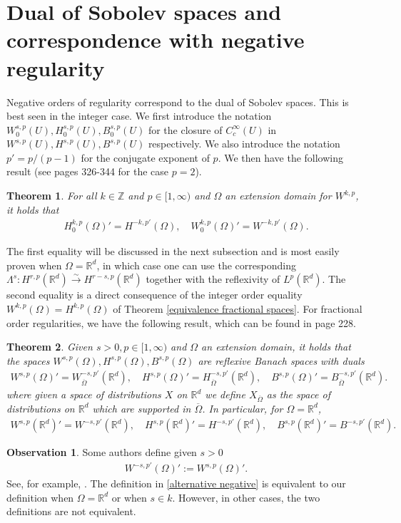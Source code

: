 \documentclass[
    a4paper,
    DIV=14,
    abstract=true,
    numbers=noenddot
]
{scrartcl}
\newtheorem{theorem}{Theorem}[section]
\theoremstyle{definition}
\newtheorem{observation}{Observation}
\newcommand{\iso}{\xrightarrow{\sim}}
\newcommand{\R}{\mathbb{R}}
\begin{document}
\section{Dual of Sobolev spaces and correspondence with negative regularity}
Negative orders of regularity correspond to the dual of Sobolev spaces. This is best seen in the integer case. We first introduce the notation $W^{s,p}_0(U),H^{s,p}_0(U),B^{s,p}_0(U)$ for the closure of $C_c^\infty(U)$ in $W^{s,p}(U),H^{s,p}(U),B^{s,p}(U)$ respectively. We also introduce the notation $p' = p/(p-1)$ for the conjugate exponent of $p$. We then have the following result (see \cite{evans2022partial} pages 326-344 for the case $p=2$).
\begin{theorem}\label{dual of integer sobolev}
    For all $k \in \mathbb{Z}$ and $p \in [1,\infty)$  and $\Omega$ an extension domain for $W^{k,p}$, it holds that
    \begin{align*}
        H^{k,p}_0(\Omega )' = H^{-k,p'}(\Omega ), \quad W^{k,p}_0(\Omega )' = W^{-k,p'}(\Omega ).
    \end{align*}
\end{theorem}
The first equality will be discussed in the next subsection and is most easily proven when $\Omega =\R^d$, in which case one can use the corresponding $\Lambda ^s: H^{r,p}(\R^d )\iso H^{r-s,p}(\R^d )$ together with the reflexivity of $L^p(\R^d )$. The second equality is a direct consequence of the integer order equality $W^{k,p}(\Omega )=H^{k,p}(\Omega )$ of Theorem \ref{equivalence fractional spaces}. For fractional order regularities, we have the following result, which can be found in \cite{agranovich2015sobolev} page 228.
\begin{theorem}
    Given $s>0, p \in [1,\infty)$ and $\Omega$ an extension domain, it holds that the spaces $W^{s,p}(\Omega ),H^{s,p}(\Omega ),B^{s,p}(\Omega )$ are reflexive Banach spaces with duals
    \begin{align*}
        W^{s,p}(\Omega )'=	W^{-s,p'}_{\overline{\Omega } }(\R^d ), \quad H^{s,p}(\Omega )' = H^{-s,p'}_{\overline{\Omega } }(\R^d ), \quad B^{s,p}(\Omega )' = B^{-s,p'}_{\overline{\Omega } }(\R^d ).
    \end{align*}
    where given a space of distributions $X$ on $\R^d$ we define $X_{\overline{\Omega }}$ as the space of distributions on $\R^d$ which are supported in $\overline{\Omega }$. In particular, for $\Omega =\R^d$,
    \begin{align*}
        W^{s,p}(\R^d )'=	W^{-s,p'}(\R^d ), \quad H^{s,p}(\R^d )' = H^{-s,p'}(\R^d ), \quad B^{s,p}(\R^d )' = B^{-s,p'}(\R^d ).
    \end{align*}
\end{theorem}
\begin{observation}
    Some authors define given $s>0$
    \begin{align}\label{alternative negative}
        W^{-s,p'}(\Omega )':=	W^{s,p}(\Omega )'.
    \end{align}
    See, for example, \cite{biccari2018local}. The definition in \eqref{alternative negative} is equivalent to our definition when $\Omega = \R^d$ or when $s \in k$. However, in other cases, the two definitions are not equivalent.
\end{observation}
\end{document}
